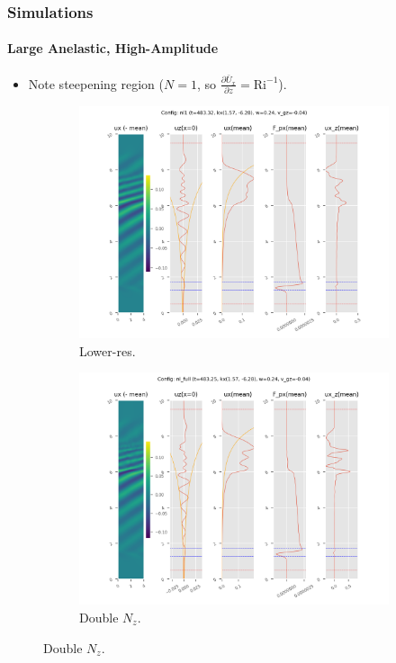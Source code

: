 \documentclass[dvipsnames, 10pt]{beamer}
\newcommand*{\pd}[2]{\frac{\partial#1}{\partial#2}}
\begin{document}
\begin{frame}
    \frametitle{Simulations}
    \framesubtitle{Large Anelastic, High-Amplitude}

    \begin{itemize}
        \item Note steepening region ($N = 1$, so $\pd{\bar{U}_x}{z} =
            \mathrm{Ri}^{-1}$).
    \end{itemize}

    \begin{figure}[t]
        \centering
        \hspace*{-19mm}%
        \begin{subfigure}{0.53\textwidth}
            \centering
            \includegraphics[width=\textwidth]{nl_low_1.png}
            \caption{Lower-res.}
        \end{subfigure}
        \begin{subfigure}{0.53\textwidth}
            \centering
            \includegraphics[width=\textwidth]{nl_full_1.png}
            \caption{Double $N_z$.}
        \end{subfigure}
        \hspace*{-19mm}%
    \end{figure}
\end{frame}
\end{document}
